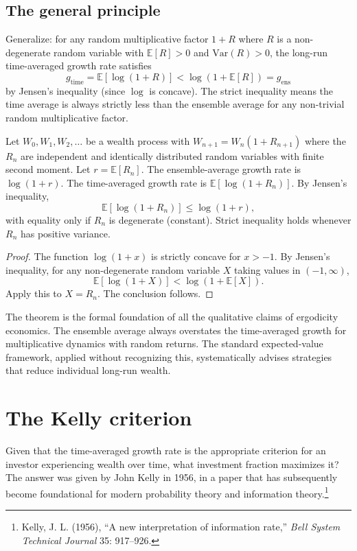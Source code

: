 \subsection{The general principle}

Generalize: for any random multiplicative factor $1 + R$ where $R$
is a non-degenerate random variable with $\mathbb{E}[R] > 0$ and
$\text{Var}(R) > 0$, the long-run time-averaged growth rate
satisfies
\[
    g_{\text{time}} = \mathbb{E}[\log(1+R)] < \log(1 + \mathbb{E}[R])
    = g_{\text{ens}}
\]
by Jensen's inequality (since $\log$ is concave). The strict
inequality means the time average is always strictly less than the
ensemble average for any non-trivial random multiplicative factor.

\begin{theorem}
\label{thm:time-ensemble-divergence}
Let $W_0, W_1, W_2, \dots$ be a wealth process with
$W_{n+1} = W_n (1 + R_{n+1})$ where the $R_n$ are independent and
identically distributed random variables with finite second moment.
Let $r = \mathbb{E}[R_n]$. The ensemble-average growth rate is
$\log(1 + r)$. The time-averaged growth rate is
$\mathbb{E}[\log(1 + R_n)]$. By Jensen's inequality,
\[
    \mathbb{E}[\log(1 + R_n)] \leq \log(1 + r),
\]
with equality only if $R_n$ is degenerate (constant). Strict
inequality holds whenever $R_n$ has positive variance.
\end{theorem}

\begin{proof}
The function $\log(1+x)$ is strictly concave for $x > -1$. By
Jensen's inequality, for any non-degenerate random variable $X$
taking values in $(-1, \infty)$,
\[
    \mathbb{E}[\log(1+X)] < \log(1 + \mathbb{E}[X]).
\]
Apply this to $X = R_n$. The conclusion follows.
\end{proof}

The theorem is the formal foundation of all the qualitative claims
of ergodicity economics. The ensemble average always overstates the
time-averaged growth for multiplicative dynamics with random
returns. The standard expected-value framework, applied without
recognizing this, systematically advises strategies that reduce
individual long-run wealth.

\section{The Kelly criterion}
\label{sec:kelly-criterion}

Given that the time-averaged growth rate is the appropriate
criterion for an investor experiencing wealth over time, what
investment fraction maximizes it? The answer was given by John Kelly
in 1956, in a paper that has subsequently become foundational for
modern probability theory and information theory.\footnote{Kelly,
J. L. (1956), ``A new interpretation of information rate,''
\emph{Bell System Technical Journal} 35: 917--926.}


